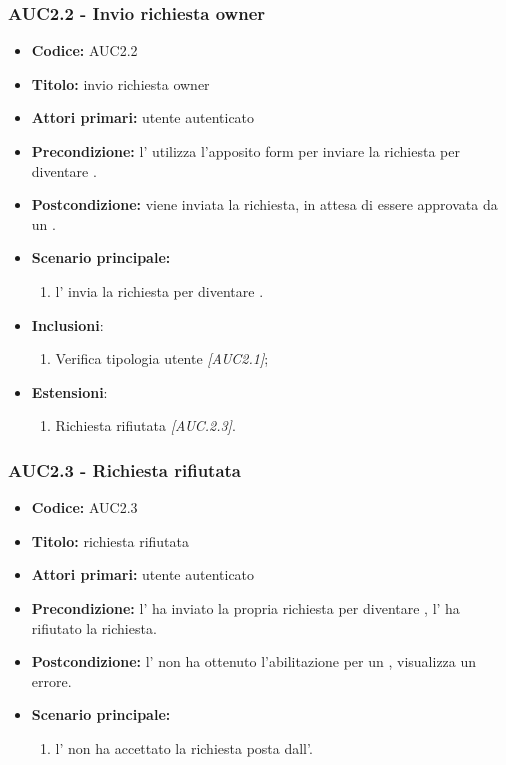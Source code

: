 \documentclass[casi-duso]{subfiles}
\begin{document}
\subsubsection{AUC2.2 - Invio richiesta owner}%
\label{subsub:AUC2.2}
\begin{itemize}
  \item \textbf{Codice:} AUC2.2
  \item \textbf{Titolo:} invio richiesta owner
  \item \textbf{Attori primari:} utente autenticato
  \item \textbf{Precondizione:} l' utilizza l'apposito form per inviare la richiesta per diventare .
  \item \textbf{Postcondizione:} viene inviata la richiesta, in attesa di essere approvata da un .
  \item \textbf{Scenario principale:}
  \begin{enumerate}
    \item l' invia la richiesta per diventare .
  \end{enumerate}
  \item \textbf{Inclusioni}:
  \begin{enumerate}
    \item Verifica tipologia utente \emph{[AUC2.1]};
  \end{enumerate}
  \item \textbf{Estensioni}:
  \begin{enumerate}
    \item Richiesta rifiutata \emph{[AUC.2.3]}.
  \end{enumerate}
\end{itemize}

\subsubsection{AUC2.3 - Richiesta rifiutata}%
\label{subsub:AUC2.3}
\begin{itemize}
  \item \textbf{Codice:} AUC2.3
  \item \textbf{Titolo:} richiesta rifiutata
  \item \textbf{Attori primari:} utente autenticato
  \item \textbf{Precondizione:} l' ha inviato la propria richiesta per diventare , l' ha rifiutato la richiesta.
  \item \textbf{Postcondizione:} l' non ha ottenuto l'abilitazione per un , visualizza un errore.
  \item \textbf{Scenario principale:}
  \begin{enumerate}
    \item l' non ha accettato la richiesta posta dall'.
  \end{enumerate}
\end{itemize}
\end{document}

